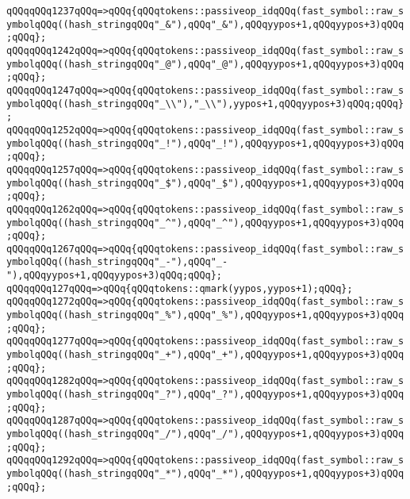 \verb|qQQqqQQq1237qQQq=>qQQq{qQQqtokens::passiveop_idqQQq(fast_symbol::raw_symbolqQQq((hash_stringqQQq"_&"),qQQq"_&"),qQQqyypos+1,qQQqyypos+3)qQQq;qQQq};|\newline
\verb|qQQqqQQq1242qQQq=>qQQq{qQQqtokens::passiveop_idqQQq(fast_symbol::raw_symbolqQQq((hash_stringqQQq"_@"),qQQq"_@"),qQQqyypos+1,qQQqyypos+3)qQQq;qQQq};|\newline
\verb|qQQqqQQq1247qQQq=>qQQq{qQQqtokens::passiveop_idqQQq(fast_symbol::raw_symbolqQQq((hash_stringqQQq"_\\"),"_\\"),yypos+1,qQQqyypos+3)qQQq;qQQq};|\newline
\verb|qQQqqQQq1252qQQq=>qQQq{qQQqtokens::passiveop_idqQQq(fast_symbol::raw_symbolqQQq((hash_stringqQQq"_!"),qQQq"_!"),qQQqyypos+1,qQQqyypos+3)qQQq;qQQq};|\newline
\verb|qQQqqQQq1257qQQq=>qQQq{qQQqtokens::passiveop_idqQQq(fast_symbol::raw_symbolqQQq((hash_stringqQQq"_$"),qQQq"_$"),qQQqyypos+1,qQQqyypos+3)qQQq;qQQq};|\newline
\verb|qQQqqQQq1262qQQq=>qQQq{qQQqtokens::passiveop_idqQQq(fast_symbol::raw_symbolqQQq((hash_stringqQQq"_^"),qQQq"_^"),qQQqyypos+1,qQQqyypos+3)qQQq;qQQq};|\newline
\verb|qQQqqQQq1267qQQq=>qQQq{qQQqtokens::passiveop_idqQQq(fast_symbol::raw_symbolqQQq((hash_stringqQQq"_-"),qQQq"_-"),qQQqyypos+1,qQQqyypos+3)qQQq;qQQq};|\newline
\verb|qQQqqQQq127qQQq=>qQQq{qQQqtokens::qmark(yypos,yypos+1);qQQq};|\newline
\verb|qQQqqQQq1272qQQq=>qQQq{qQQqtokens::passiveop_idqQQq(fast_symbol::raw_symbolqQQq((hash_stringqQQq"_%"),qQQq"_%"),qQQqyypos+1,qQQqyypos+3)qQQq;qQQq};|\newline
\verb|qQQqqQQq1277qQQq=>qQQq{qQQqtokens::passiveop_idqQQq(fast_symbol::raw_symbolqQQq((hash_stringqQQq"_+"),qQQq"_+"),qQQqyypos+1,qQQqyypos+3)qQQq;qQQq};|\newline
\verb|qQQqqQQq1282qQQq=>qQQq{qQQqtokens::passiveop_idqQQq(fast_symbol::raw_symbolqQQq((hash_stringqQQq"_?"),qQQq"_?"),qQQqyypos+1,qQQqyypos+3)qQQq;qQQq};|\newline
\verb|qQQqqQQq1287qQQq=>qQQq{qQQqtokens::passiveop_idqQQq(fast_symbol::raw_symbolqQQq((hash_stringqQQq"_/"),qQQq"_/"),qQQqyypos+1,qQQqyypos+3)qQQq;qQQq};|\newline
\verb|qQQqqQQq1292qQQq=>qQQq{qQQqtokens::passiveop_idqQQq(fast_symbol::raw_symbolqQQq((hash_stringqQQq"_*"),qQQq"_*"),qQQqyypos+1,qQQqyypos+3)qQQq;qQQq};|\newline
